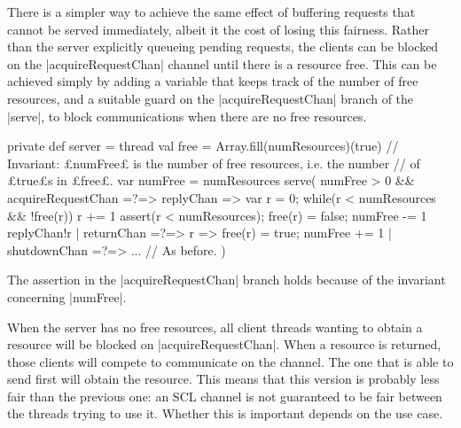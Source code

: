 There is a simpler way to achieve the same effect of buffering requests that
cannot be served immediately, albeit it the cost of losing this fairness.
Rather than the server explicitly queueing pending requests, the clients can
be blocked on the |acquireRequestChan| channel until there is a resource free.
This can be achieved simply by adding a variable that keeps track of the
number of free resources, and a suitable guard on the |acquireRequestChan|
branch of the |serve|, to block communications when there are no free
resources.%
%
\begin{scala}
  private def server = thread{
    val free = Array.fill(numResources)(true)
    // Invariant: £numFree£ is the number of free resources, i.e. the number 
    // of £true£s in £free£.
    var numFree = numResources
    serve(
      numFree > 0 && acquireRequestChan =?=> { replyChan => 
	var r = 0; while(r < numResources && !free(r)) r += 1
	assert(r < numResources); free(r) = false; numFree -= 1
        replyChan!r
      }
      | returnChan =?=> { r => free(r) = true; numFree += 1 }
      | shutdownChan =?=> { ... } // As before.
    )
  }
\end{scala}
%
The assertion in the |acquireRequestChan| branch holds because of
the invariant concerning |numFree|.

When the server has no free resources, all client threads wanting to obtain a
resource will be blocked on |acquireRequestChan|.
%
When a resource is returned, those clients will compete to communicate on the
channel.  The one that is able to send first will obtain the resource.
%
This means that this version is probably less fair than the previous one: an SCL
channel is not guaranteed to be fair between the threads trying to use it.
Whether this is important depends on the use case.






